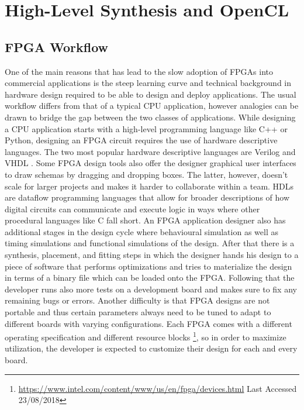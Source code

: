 
\section{High-Level Synthesis and OpenCL} 

\subsection{FPGA Workflow}
One of the main reasons that has lead to the slow adoption of FPGAs into commercial applications is the steep learning curve and technical background in hardware design required to be able to design and deploy applications. The usual workflow differs from that of a typical CPU application, however analogies can be drawn to bridge the gap between the two classes of applications. While designing a CPU application starts with a high-level programming language like C++ or Python, designing an FPGA circuit requires the use of hardware descriptive languages. The two most popular hardware descriptive languages are Verilog and VHDL \cite{wilson2015design}. Some FPGA design tools also offer the designer graphical user interfaces to draw schemas by dragging and dropping boxes. The latter, however, doesn’t scale for larger projects and makes it harder to collaborate within a team. HDLs are dataflow programming languages that allow for broader descriptions of how digital circuits can communicate and execute logic in ways where other procedural languages like C fall short. An FPGA application designer also has additional stages in the design cycle where behavioural simulation as well as timing simulations and functional simulations of the design. After that there is a synthesis, placement, and fitting steps in which the designer hands his design to a piece of software that performs optimizations and tries to materialize the design in terms of a binary file which can be loaded onto the FPGA. Following that the developer runs also more tests on a development board and makes sure to fix any remaining bugs or errors. Another difficulty is that FPGA designs are not portable and thus certain parameters always need to be tuned to adapt to different boards with varying configurations. Each FPGA comes with a different operating specification and different resource blocks \footnote{\url{https://www.intel.com/content/www/us/en/fpga/devices.html} Last Accessed 23/08/2018}, so in order to maximize utilization, the developer is expected to customize their design for each and every board. 

